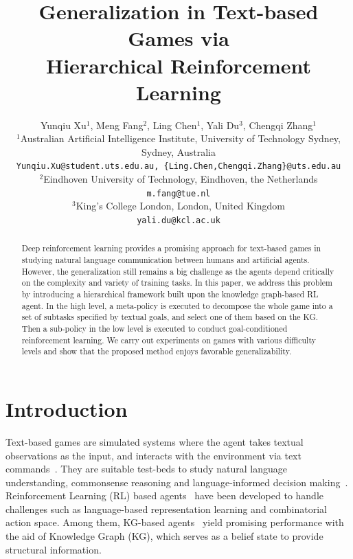 \documentclass[11pt]{article}
\title{Generalization in Text-based Games via \\ Hierarchical Reinforcement Learning}
\author{Yunqiu Xu$^1$, Meng Fang$^2$, Ling Chen$^1$, Yali Du$^3$, Chengqi Zhang$^1$ \\
  $^1$Australian Artificial Intelligence Institute, University of Technology Sydney, Sydney, Australia \\
  \texttt{Yunqiu.Xu@student.uts.edu.au, \{Ling.Chen,Chengqi.Zhang\}@uts.edu.au}\\
  $^2$Eindhoven University of Technology, Eindhoven, the Netherlands \\
  \texttt{m.fang@tue.nl} \\
  $^3$King’s College London, London, United Kingdom \\
  \texttt{yali.du@kcl.ac.uk} \\}
\begin{document}
\maketitle
\begin{abstract}
Deep reinforcement learning provides a promising approach for text-based games in studying natural language communication between humans and artificial agents. 
However, the generalization still remains a big challenge as the agents depend critically on the complexity and variety of training tasks. 
In this paper, we address this problem by introducing a hierarchical framework built upon the knowledge graph-based RL agent. 
In the high level, a meta-policy is executed to decompose the whole game into a set of subtasks specified by textual goals, and select one of them based on the KG. 
Then a sub-policy in the low level is executed to conduct goal-conditioned reinforcement learning.  
We carry out experiments on games with various difficulty levels and show that the proposed method enjoys favorable generalizability. 
\end{abstract}

\section{Introduction}

Text-based games are simulated systems where the agent takes textual observations as the input, and interacts with the environment via text commands~\cite{hausknecht2019jericho}. 
They are suitable test-beds to study natural language understanding, commonsense reasoning and language-informed decision making~\cite{luketina2019survey}.
Reinforcement Learning (RL) based agents~\cite{narasimhan2015language,zahavy2018nips} have been developed to handle challenges such as language-based representation learning and combinatorial action space. 
Among them, KG-based agents~\cite{ammanabrolu2019kga2c} yield promising performance with the aid of Knowledge Graph (KG), which serves as a belief state to provide structural information.
\end{document}
